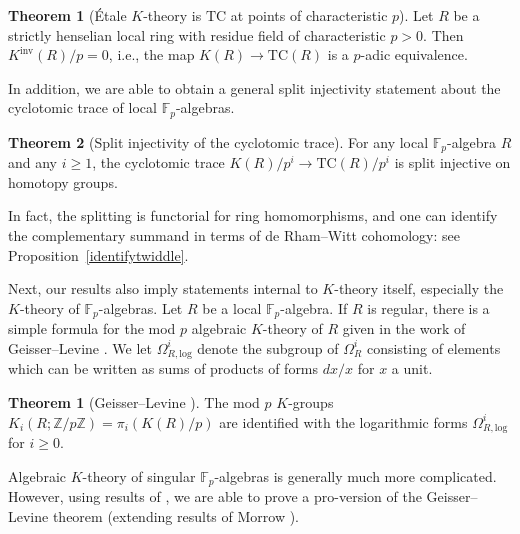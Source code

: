 \documentclass{amsart}
\newcommand{\knf}{K^{\mathrm{inv}}}
\theoremstyle{definition}
\newtheorem{theorem}[definition]{Theorem}
\newtheorem{thm}{Theorem}
\newcommand{\TC}{\mathrm{TC}}
\begin{document}
\begin{thm}[\'Etale $K$-theory is $\TC$ at points of characteristic $p$] 
Let $R$ be a strictly henselian local ring with residue field of characteristic
$p > 0$. Then $\knf(R)/p = 0$, i.e., the map $K(R) \to \TC(R)$ is a $p$-adic equivalence. 
\end{thm} 

In addition, we are able to obtain a general split injectivity statement about the
cyclotomic trace of local $\mathbb{F}_p$-algebras. 
\begin{thm}[Split injectivity of the cyclotomic trace]
For any local $\mathbb{F}_p$-algebra $R$ and any $i \geq 1$, the cyclotomic trace $K(R)/p^i \to
\TC(R)/p^i$ is split injective on homotopy groups. 
\end{thm}

In fact, the splitting is functorial for ring homomorphisms, and  one
can identify the complementary summand in terms of de Rham--Witt cohomology: see
Proposition~\ref{identifytwiddle}.


Next, our results also imply statements internal to $K$-theory itself, especially the
$K$-theory of $\mathbb{F}_p$-algebras. 
Let $R$ be a local $\mathbb{F}_p$-algebra. 
If $R$ is regular, there is a simple formula for the mod $p$ algebraic $K$-theory of $R$ 
given in the work of Geisser--Levine \cite{GL}. 
We let $\Omega^i_{R, \mathrm{log}}$ denote the subgroup of $\Omega^i_R$
consisting of elements which can be written as sums of products
of forms $dx/x$ for $x$ a unit. 

\begin{theorem}[Geisser--Levine \cite{GL}] 
The mod $p$ $K$-groups
$K_i(R; \mathbb{Z}/p\mathbb{Z}) = \pi_i( K(R)/p)$ are identified with the logarithmic 
forms $\Omega^{i}_{R, \mathrm{log}}$ for $i \geq 0$. 
\end{theorem} 

Algebraic $K$-theory of singular $\mathbb{F}_p$-algebras is generally much more
complicated. However, using results of \cite{Morrow-HW, Morrowpro}, we are able to prove a
pro-version of the Geisser--Levine theorem (extending results of Morrow
\cite{Morrow-HW}). 
\end{document}
